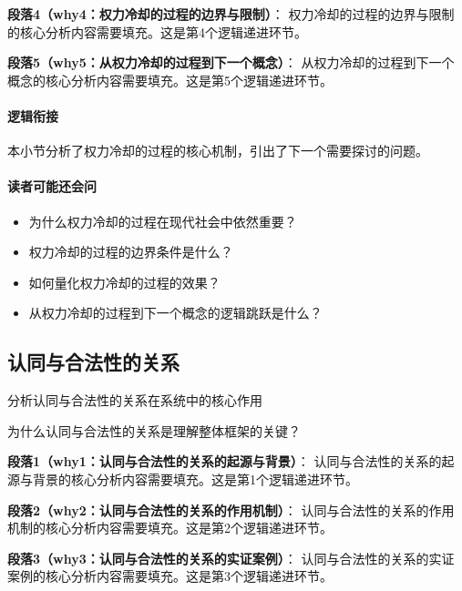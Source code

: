 \documentclass[../main.tex]{subfiles}
\begin{document}
{{\textbf{段落4（why4：权力冷却的过程的边界与限制）}：
权力冷却的过程的边界与限制的核心分析内容需要填充。这是第4个逻辑递进环节。


\textbf{段落5（why5：从权力冷却的过程到下一个概念）}：
从权力冷却的过程到下一个概念的核心分析内容需要填充。这是第5个逻辑递进环节。


\paragraph*{逻辑衔接}
本小节分析了权力冷却的过程的核心机制，引出了下一个需要探讨的问题。

\paragraph*{读者可能还会问}
\begin{itemize}
\item 为什么权力冷却的过程在现代社会中依然重要？
\item 权力冷却的过程的边界条件是什么？
\item 如何量化权力冷却的过程的效果？
\item 从权力冷却的过程到下一个概念的逻辑跳跃是什么？
\end{itemize}


\subsection{认同与合法性的关系}

\begin{motivation}
分析认同与合法性的关系在系统中的核心作用
\end{motivation}

\begin{logicmap}
[逻辑链占位]
\end{logicmap}

\begin{questionbox}
为什么认同与合法性的关系是理解整体框架的关键？
\end{questionbox}

\textbf{段落1（why1：认同与合法性的关系的起源与背景）}：
认同与合法性的关系的起源与背景的核心分析内容需要填充。这是第1个逻辑递进环节。


\textbf{段落2（why2：认同与合法性的关系的作用机制）}：
认同与合法性的关系的作用机制的核心分析内容需要填充。这是第2个逻辑递进环节。


\textbf{段落3（why3：认同与合法性的关系的实证案例）}：
认同与合法性的关系的实证案例的核心分析内容需要填充。这是第3个逻辑递进环节。


}}
\end{document}
